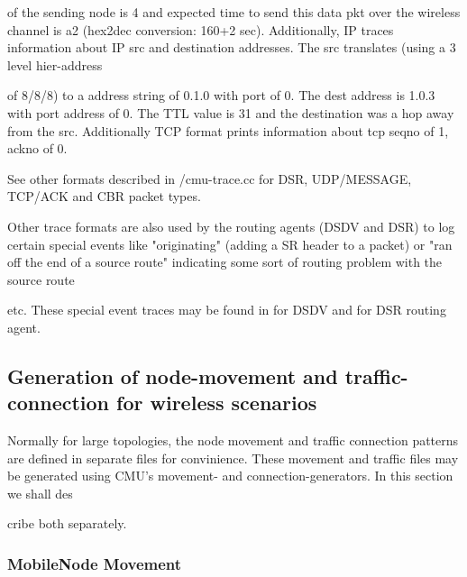  of the sending node is 4 and expected time to send this data pkt over the wireless channel is a2 (hex2dec conversion: 160+2 sec). Additionally, IP traces information about IP src and destination addresses. The src translates (using a 3 level hier-address











 of 8/8/8) to a address string of 0.1.0 with port of 0. The dest address is 1.0.3 with port address of 0. The TTL value is 31 and the destination was a hop away from the src. Additionally TCP format prints information about tcp seqno of 1, ackno of 0. 

See other formats described in \nsf/cmu-trace.cc for DSR, UDP/MESSAGE, TCP/ACK and CBR packet types.

Other trace formats are also used by the routing agents (DSDV and DSR) to log certain special events like "originating" (adding a SR header to a packet) or  "ran off the end of a source route" indicating some sort of routing problem with the source route 











etc. These special event traces may be found in  for DSDV and  for DSR routing agent.


\subsection{Generation of node-movement and traffic-connection for wireless scenarios}
\label{sec:mobile-scen-generator}

Normally for large topologies, the node movement and traffic connection patterns are defined in separate files for convinience. These movement and traffic files may be generated using CMU's movement- and connection-generators. In this section we shall des











cribe both separately.


\subsubsection{MobileNode Movement}
\label{sec:mobile-movement-file}

